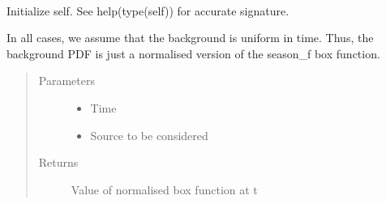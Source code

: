 \documentclass[letterpaper,10pt,english]{sphinxmanual}
\begin{document}
\begin{fulllineitems}
\label{\detokenize{index:flarestack.core.time_pdf.TimePDF}}~

\begin{fulllineitems}
\label{\detokenize{index:flarestack.core.time_pdf.TimePDF.__init__}}
Initialize self.  See help(type(self)) for accurate signature.

\end{fulllineitems}


\begin{fulllineitems}
\label{\detokenize{index:flarestack.core.time_pdf.TimePDF.background_f}}
In all cases, we assume that the background is uniform in time.
Thus, the background PDF is just a normalised version of the season\_f
box function.
\begin{quote}\begin{description}
\item[{Parameters}] \leavevmode\begin{itemize}
\item {} 
 \textendash{} Time

\item {} 
 \textendash{} Source to be considered

\end{itemize}

\item[{Returns}] \leavevmode
Value of normalised box function at t

\end{description}\end{quote}

\end{fulllineitems}


\end{fulllineitems}
\end{document}
